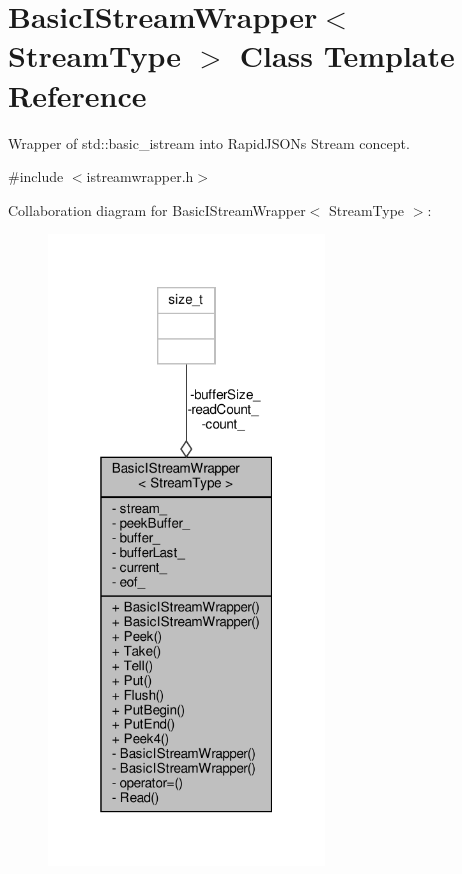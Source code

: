 \hypertarget{classBasicIStreamWrapper}{}\section{Basic\+I\+Stream\+Wrapper$<$ Stream\+Type $>$ Class Template Reference}
\label{classBasicIStreamWrapper}


Wrapper of {\ttfamily std\+::basic\+\_\+istream} into Rapid\+J\+S\+ON\textquotesingle{}s Stream concept.  




{\ttfamily \#include $<$istreamwrapper.\+h$>$}



Collaboration diagram for Basic\+I\+Stream\+Wrapper$<$ Stream\+Type $>$\+:
\nopagebreak
\begin{figure}[H]
\begin{center}
\leavevmode
\includegraphics[width=208pt]{classBasicIStreamWrapper__coll__graph}
\end{center}
\end{figure}

